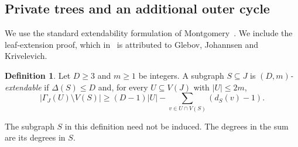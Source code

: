 \documentclass[10pt,letterpaper]{article}
\theoremstyle{definition}
\newtheorem{definition}[theorem]{Definition}
\theoremstyle{remark}
\begin{document}
\subsection{Private trees and an additional outer cycle}

We use the standard extendability formulation of Montgomery~\cite[Definition~3.1 and Lemma~3.3]{Montgomery}. We include the leaf-extension proof, which in~\cite{Montgomery} is attributed to Glebov, Johannsen and Krivelevich.

\begin{definition}\label{def:extend}
Let $D\ge3$ and $m\ge1$ be integers. A subgraph $S\subseteq J$ is \emph{$(D,m)$-extendable} if $\Delta(S)\le D$ and, for every $U\subseteq V(J)$ with $|U|\le2m$,
\begin{equation}\label{eq:extend}
|\Gamma_J(U)\setminus V(S)|
\ge(D-1)|U|-\sum_{v\in U\cap V(S)}(d_S(v)-1).
\end{equation}
\end{definition}

The subgraph $S$ in this definition need not be induced. The degrees in the sum are its degrees in $S$.
\end{document}
